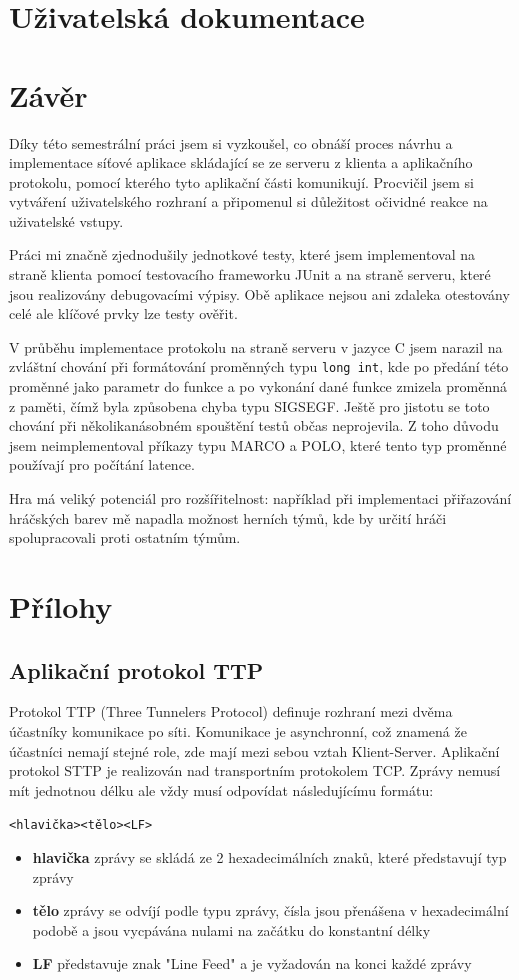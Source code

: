 \documentclass[12pt,a4paper]{article}
\let\oldsection\section
\renewcommand\section{\clearpage\oldsection}
\begin{document}
\section{Uživatelská dokumentace}

\section{Závěr}
Díky této semestrální práci jsem si vyzkoušel, co obnáší proces návrhu a implementace síťové aplikace skládající se ze serveru z klienta a aplikačního protokolu, pomocí kterého tyto aplikační části komunikují.
Procvičil jsem si vytváření uživatelského rozhraní a připomenul si důležitost očividné reakce na uživatelské vstupy.

Práci mi značně zjednodušily jednotkové testy, které jsem implementoval na straně klienta pomocí testovacího frameworku JUnit a na straně serveru, které jsou realizovány debugovacími výpisy. Obě aplikace nejsou ani zdaleka otestovány celé ale klíčové prvky lze testy ověřit.

V průběhu implementace protokolu na straně serveru v jazyce C jsem narazil na zvláštní chování při formátování proměnných typu \texttt{long int}, kde po předání této proměnné jako parametr do funkce a po vykonání dané funkce zmizela proměnná z paměti, čímž byla způsobena chyba typu SIGSEGF. Ještě pro jistotu se toto chování při několikanásobném spouštění testů občas neprojevila. Z toho důvodu jsem neimplementoval příkazy typu MARCO a POLO, které tento typ proměnné používají pro počítání latence.

Hra má veliký potenciál pro rozšířitelnost: například při implementaci přiřazování hráčských barev mě napadla možnost herních týmů, kde by určití hráči spolupracovali proti ostatním týmům.
\section{Přílohy}
\subsection{Aplikační protokol TTP}
Protokol TTP (Three Tunnelers Protocol) definuje rozhraní mezi dvěma účastníky komunikace po síti. Komunikace je asynchronní, což znamená že účastníci nemají stejné role, zde mají mezi sebou vztah Klient-Server.
Aplikační protokol STTP je realizován nad transportním protokolem TCP. Zprávy nemusí mít jednotnou délku ale vždy musí odpovídat následujícímu formátu:
\begin{center}
\texttt{<hlavička><tělo><LF>}
\end{center}
\begin{itemize}
\setlength\itemsep{0em}
\item \textbf{hlavička} zprávy se skládá ze 2 hexadecimálních znaků, které představují typ zprávy
\item \textbf{tělo} zprávy se odvíjí podle typu zprávy, čísla jsou přenášena v hexadecimální podobě a jsou vycpávána nulami na začátku do konstantní délky
\item \textbf{LF} představuje znak "Line Feed" a je vyžadován na konci každé zprávy
\end{itemize}
\end{document}
